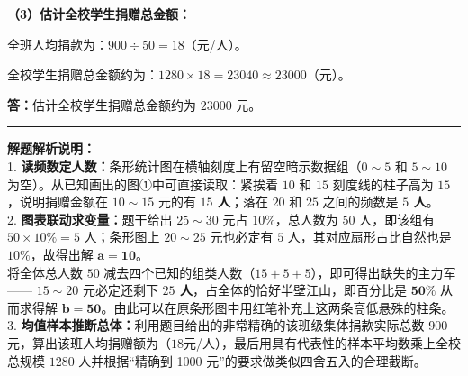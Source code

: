 \begin{center}
\end{center}

\vspace{0.6cm}

\textbf{（3）估计全校学生捐赠总金额：}

\vspace{0.4cm}
全班人均捐款为：$900 \div 50 = 18$（元/人）。

全校学生捐赠总金额约为：$1280 \times 18 = 23040 \approx 23000$（元）。

\vspace{0.4cm}
\textbf{答：}估计全校学生捐赠总金额约为 $23000$ 元。

\vspace{0.8cm}
\hrule
\vspace{0.4cm}

{\small\color{gray}
\textbf{解题解析说明：}\\
1. \textbf{读频数定人数：}条形统计图在横轴刻度上有留空暗示数据组（$0\sim 5$ 和 $5\sim 10$ 为空）。从已知画出的图①中可直接读取：紧挨着 $10$ 和 $15$ 刻度线的柱子高为 $15$，说明捐赠金额在 $10\sim 15$ 元的有 \textbf{$15$ 人}；落在 $20$ 和 $25$ 之间的频数是 \textbf{$5$ 人}。\\
2. \textbf{图表联动求变量：}题干给出 $25\sim 30$ 元占 $10\%$，总人数为 $50$ 人，即该组有 $50 \times 10\% = 5$ 人；条形图上 $20\sim 25$ 元也必定有 $5$ 人，其对应扇形占比自然也是 $10\%$，故得出解 $\boldsymbol{a=10}$。\\
将全体总人数 $50$ 减去四个已知的组类人数（$15+5+5$），即可得出缺失的主力军—— $15\sim 20$ 元必定还剩下 \textbf{$25$ 人}，占全体的恰好半壁江山，即百分比是 $\boldsymbol{50\%}$ 从而求得解 $\boldsymbol{b=50}$。由此可以在原条形图中用红笔补充上这两条高低悬殊的柱条。\\
3. \textbf{均值样本推断总体：}利用题目给出的非常精确的该班级集体捐款实际总数 $900$ 元，算出该班人均捐赠额为（$18$元/人），最后用具有代表性的样本平均数乘上全校总规模 $1280$ 人并根据“精确到 1000 元”的要求做类似四舍五入的合理截断。
}

